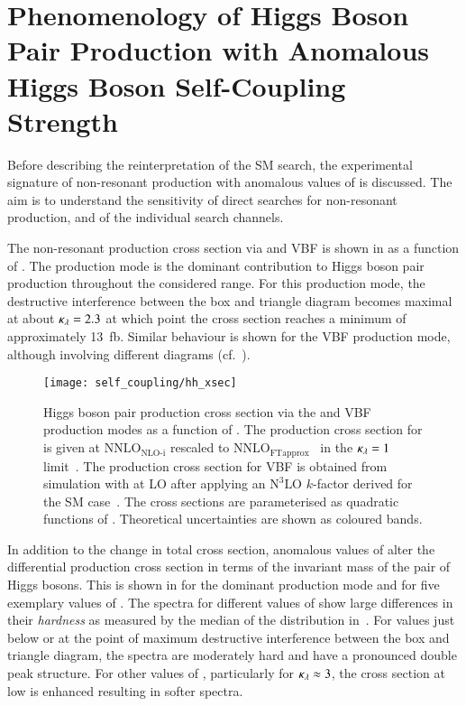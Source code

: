 \section{Phenomenology of Higgs Boson Pair Production with Anomalous
  Higgs Boson Self-Coupling Strength}%
\label{sec:self_coupling_pheno}

Before describing the reinterpretation of the SM \HH search, the
experimental signature of non-resonant \HH production with anomalous
values of \klambda is discussed. The aim is to understand the
sensitivity of direct searches for non-resonant \HH production, and of
the individual search channels.

The non-resonant \HH production cross section via \ggF and VBF is
shown in  as a function of \klambda. The \ggF
production mode is the dominant contribution to Higgs boson pair
production throughout the considered \klambda range. For this
production mode, the destructive interference between the box and
triangle diagram becomes maximal at about $\kappa_{\lambda} = 2.3$ at which
point the cross section reaches a minimum of approximately
\SI{13}{\femto\barn}. Similar behaviour is shown for the VBF
production mode, although involving different diagrams (cf.\
).

\begin{figure}[htbp]
  \centering

  \texttt{[image: self\_coupling/hh\_xsec]}

  \caption{Higgs boson pair production cross section via the \ggF and
    VBF production modes as a function of \klambda. The production
    cross section for \ggF is given at $\text{NNLO}_{\text{NLO-i}}$
    rescaled to
    $\text{NNLO}_{\text{FTapprox}}$~\cite{Grazzini:2018bsd} in the
    $\kappa_{\lambda} = 1$
    limit~\cite{Amoroso:2020lgh,Baglio:2020wgt,LHCHWGHH}. The
    production cross section for VBF is obtained from simulation with
    \MGNLO at LO after applying an $\text{N}^3\text{LO}$ $k$-factor
    derived for the SM case~\cite{Dreyer:2018qbw,LHCHWGHH}. The cross
    sections are parameterised as quadratic functions of
    \klambda. Theoretical uncertainties are shown as coloured bands.}%
  \label{fig:hh_xsec_incl}
\end{figure}

In addition to the change in total cross section, anomalous values of
\klambda alter the differential \HH production cross section in terms
of the invariant mass of the pair of Higgs bosons. This is shown in
\Cref{fig:hh_xsec_mhh} for the dominant \ggF production mode and for
five exemplary values of \klambda. The \mHH spectra for different
values of \klambda show large differences in their \emph{hardness} as
measured by the median of the \mHH distribution
in~. For \klambda values just below or at the
point of maximum destructive interference between the box and triangle
diagram, the \mHH spectra are moderately hard and have a pronounced
double peak structure. For other values of \klambda, particularly for
$\kappa_{\lambda} \approx 3$, the cross section at low \mHH is enhanced
resulting in softer \mHH spectra.

